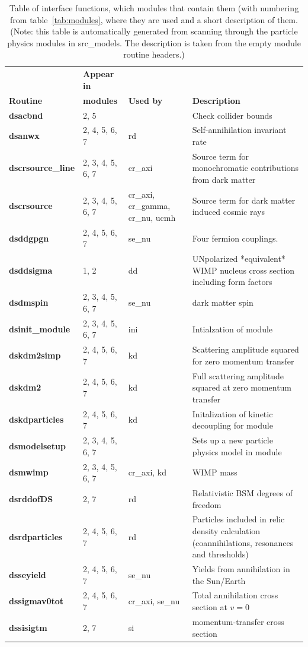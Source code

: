 \documentclass[a4paper,10pt,oneside]{book}
\newcommand{\code}[1]{\ft{#1}}
\newcommand{\ft}[1]{\textsf{#1}}
\newcommand{\ftb}[1]{{\bfseries \sffamily #1}}
\begin{document}
\begin{table}[!h]
\begin{tabular}{llp{3cm}p{6cm}}
 & {\bfseries Appear in} & {\bfseries } & {\bfseries } \\
{\bfseries Routine} & {\bfseries modules} & {\bfseries Used by} & {\bfseries Description} \\
\hline
\ftb{dsacbnd} & 2, 5 &  &  Check collider bounds \\[0.5ex]
\ftb{dsanwx} & 2, 4, 5, 6, 7 & rd &  Self-annihilation invariant rate \\[0.5ex]
\ftb{dscrsource\_line} & 2, 3, 4, 5, 6, 7 & cr\_axi &  Source term for monochromatic contributions from dark matter \\[0.5ex]
\ftb{dscrsource} & 2, 3, 4, 5, 6, 7 & cr\_axi, cr\_gamma, cr\_nu, ucmh &  Source term for dark matter induced cosmic rays \\[0.5ex]
\ftb{dsddgpgn} & 2, 4, 5, 6, 7 & se\_nu &  Four fermion couplings. \\[0.5ex]
\ftb{dsddsigma} & 1, 2 & dd &  UNpolarized *equivalent* WIMP nucleus cross section including form factors \\[0.5ex]
\ftb{dsdmspin} & 2, 3, 4, 5, 6, 7 & se\_nu &  dark matter spin \\[0.5ex]
\ftb{dsinit\_module} & 2, 3, 4, 5, 6, 7 & ini &  Intialzation of module \\[0.5ex]
\ftb{dskdm2simp} & 2, 4, 5, 6, 7 & kd &  Scattering amplitude squared for zero momentum transfer \\[0.5ex]
\ftb{dskdm2} & 2, 4, 5, 6, 7 & kd &  Full scattering amplitude squared at zero momentum transfer \\[0.5ex]
\ftb{dskdparticles} & 2, 4, 5, 6, 7 & kd &  Initalization of kinetic decoupling for module \\[0.5ex]
\ftb{dsmodelsetup} & 2, 3, 4, 5, 6, 7 &  &  Sets up a new particle physics model in module \\[0.5ex]
\ftb{dsmwimp} & 2, 3, 4, 5, 6, 7 & cr\_axi, kd &  WIMP mass \\[0.5ex]
\ftb{dsrddofDS} & 2, 7 & rd &  Relativistic BSM degrees of freedom  \\[0.5ex]
\ftb{dsrdparticles} & 2, 4, 5, 6, 7 & rd &  Particles included in relic density calculation (coannihilations, resonances and thresholds) \\[0.5ex]
\ftb{dsseyield} & 2, 4, 5, 6, 7 & se\_nu &  Yields from annihilation in the Sun/Earth \\[0.5ex]
\ftb{dssigmav0tot} & 2, 4, 5, 6, 7 & cr\_axi, se\_nu &  Total annihilation cross section at $v=0$ \\[0.5ex]
\ftb{dssisigtm} & 2, 7 & si &  momentum-transfer cross section \\[0.5ex]
\hline
\end{tabular}
 \smallskip
\caption{Table of interface functions, which modules that contain them (with numbering from table~\ref{tab:modules}, where they are used and a short description of them. (Note: this table is automatically generated from scanning through the particle physics modules in \code{src\_models}. The description is taken from the \code{empty} module routine headers.)}
\label{tab:if}
\end{table}
\end{document}
